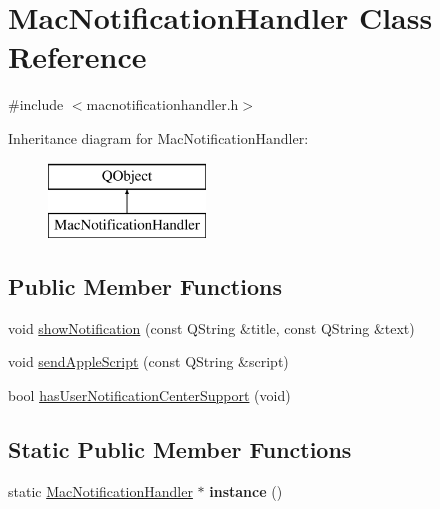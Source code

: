 \hypertarget{class_mac_notification_handler}{}\section{Mac\+Notification\+Handler Class Reference}
\label{class_mac_notification_handler}


{\ttfamily \#include $<$macnotificationhandler.\+h$>$}

Inheritance diagram for Mac\+Notification\+Handler\+:\begin{figure}[H]
\begin{center}
\leavevmode
\includegraphics[height=2.000000cm]{class_mac_notification_handler}
\end{center}
\end{figure}
\subsection*{Public Member Functions}
\begin{DoxyCompactItemize}
\item 
void \mbox{\hyperlink{class_mac_notification_handler_abeb9b3a7c81397499fbb7e1d24610cd9}{show\+Notification}} (const Q\+String \&title, const Q\+String \&text)
\item 
void \mbox{\hyperlink{class_mac_notification_handler_a39051c00850f7b6cb644cdb60006dc2e}{send\+Apple\+Script}} (const Q\+String \&script)
\item 
bool \mbox{\hyperlink{class_mac_notification_handler_a132cba3b7df82afd3b07ca08599b94a5}{has\+User\+Notification\+Center\+Support}} (void)
\end{DoxyCompactItemize}
\subsection*{Static Public Member Functions}
\begin{DoxyCompactItemize}
\item 
\mbox{\label{class_mac_notification_handler_a8ba83adcb63db47e3f7a76a0afc02b9d}} 
static \mbox{\hyperlink{class_mac_notification_handler}{Mac\+Notification\+Handler}} $\ast$ {\bfseries instance} ()
\end{DoxyCompactItemize}


